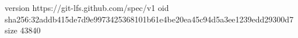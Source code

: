 version https://git-lfs.github.com/spec/v1
oid sha256:32addb415de7d9e9973425368101b61e4be20ea45c94d5a3ee1239edd29300d7
size 43840
